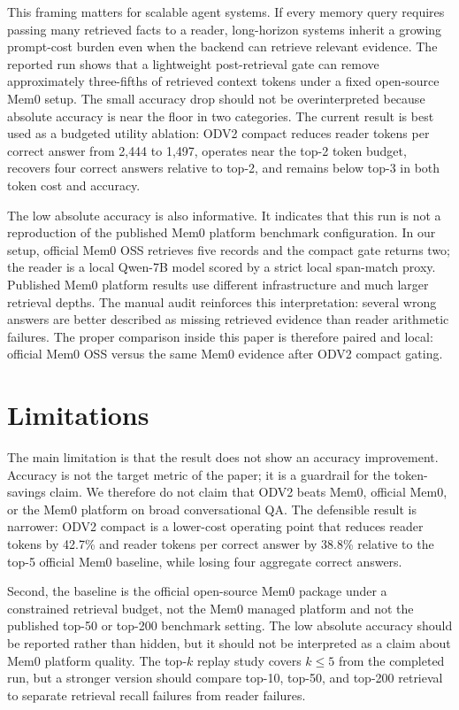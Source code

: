 \documentclass{article}
\begin{document}
This framing matters for scalable agent systems. If every memory query requires passing many retrieved facts to a reader, long-horizon systems inherit a growing prompt-cost burden even when the backend can retrieve relevant evidence. The reported run shows that a lightweight post-retrieval gate can remove approximately three-fifths of retrieved context tokens under a fixed open-source Mem0 setup. The small accuracy drop should not be overinterpreted because absolute accuracy is near the floor in two categories. The current result is best used as a budgeted utility ablation: ODV2 compact reduces reader tokens per correct answer from 2{,}444 to 1{,}497, operates near the top-2 token budget, recovers four correct answers relative to top-2, and remains below top-3 in both token cost and accuracy.

The low absolute accuracy is also informative. It indicates that this run is not a reproduction of the published Mem0 platform benchmark configuration. In our setup, official Mem0 OSS retrieves five records and the compact gate returns two; the reader is a local Qwen-7B model scored by a strict local span-match proxy. Published Mem0 platform results use different infrastructure and much larger retrieval depths. The manual audit reinforces this interpretation: several wrong answers are better described as missing retrieved evidence than reader arithmetic failures. The proper comparison inside this paper is therefore paired and local: official Mem0 OSS versus the same Mem0 evidence after ODV2 compact gating.

\section{Limitations}

The main limitation is that the result does not show an accuracy improvement. Accuracy is not the target metric of the paper; it is a guardrail for the token-savings claim. We therefore do not claim that ODV2 beats Mem0, official Mem0, or the Mem0 platform on broad conversational QA. The defensible result is narrower: ODV2 compact is a lower-cost operating point that reduces reader tokens by 42.7\% and reader tokens per correct answer by 38.8\% relative to the top-5 official Mem0 baseline, while losing four aggregate correct answers.

Second, the baseline is the official open-source Mem0 package under a constrained retrieval budget, not the Mem0 managed platform and not the published top-50 or top-200 benchmark setting. The low absolute accuracy should be reported rather than hidden, but it should not be interpreted as a claim about Mem0 platform quality. The top-$k$ replay study covers $k \le 5$ from the completed run, but a stronger version should compare top-10, top-50, and top-200 retrieval to separate retrieval recall failures from reader failures.
\end{document}
